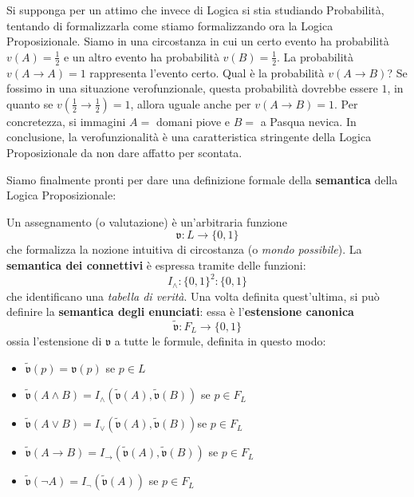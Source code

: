 Si supponga per un attimo che invece di Logica si stia studiando Probabilità, 
tentando di formalizzarla come stiamo formalizzando ora la Logica Proposizionale. 
Siamo in una circostanza in cui un certo evento ha probabilità
$v(A) = \frac{1}{2}$ e un altro evento ha probabilità $v(B) = \frac{1}{2}$. 
La probabilità $v(A \rightarrow A) = 1$ rappresenta l'evento certo. 
Qual è la probabilità $v(A \rightarrow B)$? Se fossimo in una situazione verofunzionale, 
questa probabilità dovrebbe essere $1$, in quanto se $v(\frac{1}{2} \rightarrow \frac{1}{2}) = 1$, 
allora uguale anche per $v(A \rightarrow B) = 1$. Per concretezza, si immagini 
$A = $ domani piove e $B = $ a Pasqua nevica.  In conclusione, la 
verofunzionalità è una caratteristica stringente della Logica Proposizionale 
da non dare affatto per scontata. 

Siamo finalmente pronti per dare una definizione formale della 
\textbf{semantica} della Logica Proposizionale: 
\begin{defi}
Un assegnamento (o valutazione) è un'arbitraria funzione 
$$
\mathfrak{v} : L \rightarrow \{0,1\}
$$ 
che formalizza la nozione intuitiva di circostanza (o \textit{mondo possibile}). 
La \textbf{semantica dei connettivi} è espressa tramite delle funzioni:
$$
I_{\land} : \{0,1\}^2 : \{0,1\}
$$
che identificano una \textit{tabella di verità}. Una volta definita quest'ultima, 
si può definire la \textbf{semantica degli enunciati}: essa è l'\textbf{estensione canonica}
$$
\widetilde{\mathfrak{v}}: F_L \rightarrow \{0,1\}
$$
ossia l'estensione di $\mathfrak{v}$ a tutte le formule, definita in questo modo: 
\begin{itemize}
  \item $\widetilde{\mathfrak{v}}(p) = \mathfrak{v}(p)$ se $p \in L$
  \item $\widetilde{\mathfrak{v}}(A \land B) = I_{\land}(\widetilde{\mathfrak{v}}(A), \widetilde{\mathfrak{v}}(B))$ se $p \in F_L$
  \item $\widetilde{\mathfrak{v}}(A \lor B) = I_{\lor}(\widetilde{\mathfrak{v}}(A), \widetilde{\mathfrak{v}}(B))$se $p \in F_L$
  \item $\widetilde{\mathfrak{v}}(A \rightarrow B) = I_{\rightarrow}(\widetilde{\mathfrak{v}}(A), \widetilde{\mathfrak{v}}(B))$ se $p \in F_L$
  \item $\widetilde{\mathfrak{v}}(\neg A) = I_{\neg}(\widetilde{\mathfrak{v}}(A))$ se $p \in F_L$
\end{itemize}
\end{defi}

